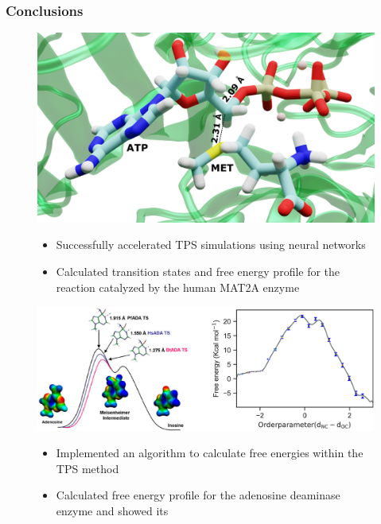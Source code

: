 \documentclass{beamer}
\begin{document}
\begin{frame}
\frametitle{Conclusions}
\begin{center}
\begin{figure}
\centering
\begin{overprint}
    \begin{center}
    \includegraphics[scale=0.09]{figures/mat2a-trans-labelled.png}
    \end{center}
    \begin{itemize}
        \item Successfully accelerated TPS simulations using neural networks
        \item Calculated transition states and free energy profile
        for the reaction catalyzed by the human MAT2A enzyme
    \end{itemize}
    \begin{center}
    \includegraphics[scale=0.5]{figures/ada_merge.png}
    \end{center}
    \begin{itemize}
        \item Implemented an algorithm to calculate free energies within the TPS method
        \item Calculated free energy profile for the adenosine deaminase enzyme and showed its

\end{itemize}
\end{overprint}
\end{figure}
\end{center}
\end{frame}
\end{document}
